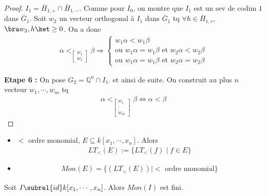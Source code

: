 \begin{proof}
            $I_1 = \bar H_{1,+} \cap \bar H_{1,-}$. Comme pour $I_0$, on montre que $I_1$ est un sev de codim $1$ dans $\bar G_1$. Soit $w_2$ un vecteur orthogonal à $I_1$ dans $\bar G_1$ tq $\forall h \in \bar H_{1,r}$, $\bra w_2, h \ket \geq 0$. On a donc
            \begin{align*}
                \alpha <_{\begin{bmatrix} w_1 \\ w_2 \end{bmatrix}} \beta \Rightarrow
                \begin{cases}
                    w_1\alpha < w_1 \beta \\
                    \text{ou } w_1\alpha = w_1 \beta \text{ et } w_2 \alpha < w_2 \beta \\
                    \text{ou } w_1 \alpha = w_1 \beta \text{ et } w_2 \alpha = w_2 \beta
                \end{cases}
            \end{align*}
            \item \textbf{Etape 6 :} On pose $G_2 = \mathbb{Q}^n \cap I_1$. et ainsi de suite. On construit au plus $n$ vecteur $w_1, \cdots, w_m$ tq
            \begin{align*}
                \alpha <_{\begin{bmatrix} w_1 \\ \vdots \\ w_m \end{bmatrix}} \beta \iff \alpha < \beta
            \end{align*}
        \end{proof}
        \begin{nota}
            \begin{itemize}
                \item $<$ ordre monomial, $E \subseteq k[x_1, \cdots, x_n]$. Alors
                \begin{align*}
                    LT_<(E) := \{LT_<(f) \mid f \in E\}
                \end{align*}
                \item \begin{align*}
                    Mon(E) = \{(LT_<(E)) \mid < \text{ ordre monomial}\}
                \end{align*}
            \end{itemize}
        \end{nota}
        \begin{theo}
            Soit $I \subrel{id} k[x_1, \cdots, x_n]$. Alors $Mon(I)$ est fini.
        \end{theo}
